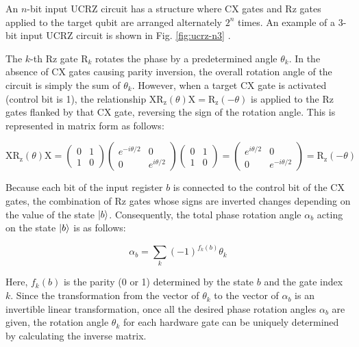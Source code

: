 \documentclass[report_2025.tex]{subfiles}
\begin{document}
An $n$-bit input UCRZ circuit has a structure where CX gates and Rz gates
applied to the target qubit are arranged alternately $2^n$ times. An example of
a 3-bit input UCRZ circuit is shown in Fig. \ref{fig:ucrz-n3}
\cite{Mottonen2004.PhysRevLett.93.130502}.

The $k$-th Rz gate $\mathrm{R}_k$ rotates the phase by a predetermined angle
$\theta_k$. In the absence of CX gates causing parity inversion, the overall
rotation angle of the circuit is simply the sum of $\theta_k$. However, when a
target CX gate is activated (control bit is 1), the relationship
$\mathrm{X}\mathrm{R_z}(\theta)\mathrm{X} = \mathrm{R_z}(-\theta)$ is applied to
the Rz gates flanked by that CX gate, reversing the sign of the rotation angle.
This is represented in matrix form as follows:

\begin{equation}
    \mathrm{X}\mathrm{R_z}(\theta)\mathrm{X} = 
    \begin{pmatrix} 0 & 1 \\ 1 & 0 \end{pmatrix}
    \begin{pmatrix} e^{-i\theta/2} & 0 \\ 0 & e^{i\theta/2} \end{pmatrix}
    \begin{pmatrix} 0 & 1 \\ 1 & 0 \end{pmatrix}
    = \begin{pmatrix} e^{i\theta/2} & 0 \\ 0 & e^{-i\theta/2} \end{pmatrix}
    = \mathrm{R_z}(-\theta)
\end{equation}

Because each bit of the input register $b$ is connected to the control bit of
the CX gates, the combination of Rz gates whose signs are inverted changes
depending on the value of the state $\ket{b}$. Consequently, the total phase
rotation angle $\alpha_b$ acting on the state $\ket{b}$ is as follows:

\begin{equation}
    \alpha_b = \sum_{k}{(-1)^{f_k(b)}\theta_k}
\end{equation}

Here, $f_k(b)$ is the parity (0 or 1) determined by the state $b$ and the gate
index $k$. Since the transformation from the vector of $\theta_k$ to the vector
of $\alpha_b$ is an invertible linear transformation, once all the desired phase
rotation angles $\alpha_b$ are given, the rotation angle $\theta_k$ for each
hardware gate can be uniquely determined by calculating the inverse matrix.
\end{document}
